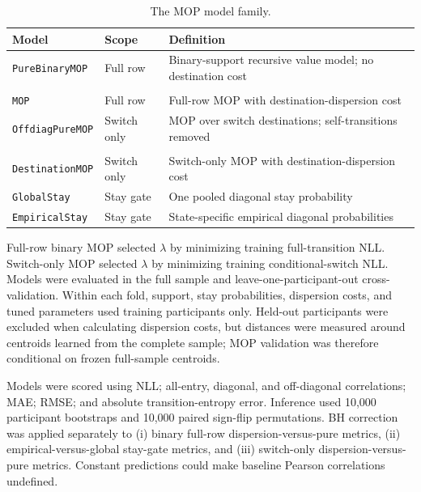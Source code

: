 \documentclass[12pt,a4paper]{report}
\newcommand{\compacttablestyle}{%
  \captionsetup{font=footnotesize,skip=2pt}%
  \small
  \setlength{\tabcolsep}{3pt}%
  \renewcommand{\arraystretch}{0.85}%
}
\begin{document}
\begin{table}[htbp]
\centering
\compacttablestyle
\caption{The MOP model family.}
\label{tab:mop_model_family}
\footnotesize
{}
\setlength{\tabcolsep}{3pt}
\renewcommand{\arraystretch}{1.08}
\begin{tabularx}{\textwidth}{@{}
>{\raggedright\arraybackslash}p{}
>{\raggedright\arraybackslash}p{}
>{\raggedright\arraybackslash}X
@{}}
\toprule
\textbf{Model} & \textbf{Scope} & \textbf{Definition} \\
\midrule
\texttt{PureBinaryMOP}
& Full row
& Binary-support recursive value model; no destination cost \\
\makecell[l]{\texttt{DispersionDestination}\\\texttt{MOP}}
& Full row
& Full-row MOP with destination-dispersion cost \\
\texttt{OffdiagPureMOP}
& Switch only
& MOP over switch destinations; self-transitions removed \\
\makecell[l]{\texttt{OffdiagDispersion}\\\texttt{DestinationMOP}}
& Switch only
& Switch-only MOP with destination-dispersion cost \\
\texttt{GlobalStay}
& Stay gate
& One pooled diagonal stay probability \\
\texttt{EmpiricalStay}
& Stay gate
& State-specific empirical diagonal probabilities \\
\bottomrule
\end{tabularx}
\end{table}

Full-row binary MOP selected $\lambda$ by minimizing training full-transition NLL. Switch-only MOP selected $\lambda$ by minimizing training conditional-switch NLL. Models were evaluated in the full sample and leave-one-participant-out cross-validation. Within each fold, support, stay probabilities, dispersion costs, and tuned parameters used training participants only. Held-out participants were excluded when calculating dispersion costs, but distances were measured around centroids learned from the complete sample; MOP validation was therefore conditional on frozen full-sample centroids.

Models were scored using NLL; all-entry, diagonal, and off-diagonal correlations; MAE; RMSE; and absolute transition-entropy error. Inference used 10,000 participant bootstraps and 10,000 paired sign-flip permutations. BH correction was applied separately to (i) binary full-row dispersion-versus-pure metrics, (ii) empirical-versus-global stay-gate metrics, and (iii) switch-only dispersion-versus-pure metrics. Constant predictions could make baseline Pearson correlations undefined.
\end{document}
